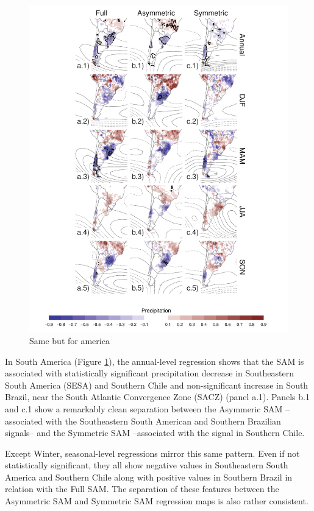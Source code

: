 \documentclass[twocol]{ametsocV5}
\begin{document}
\begin{figure}
\includegraphics{pp-regr-america-1} \caption[Same but for america]{Same but for america}\label{fig:pp-regr-america}
\end{figure}

In South America (Figure \ref{fig:pp-regr-america}), the annual-level
regression shows that the SAM is associated with statistically
significant precipitation decrease in Southeastern South America (SESA)
and Southern Chile and non-significant increase in South Brazil, near
the South Atlantic Convergence Zone (SACZ) (panel a.1). Panels b.1 and
c.1 show a remarkably clean separation between the Asymmeric SAM
--associated with the Southeastern South American and Southern Brazilian
signals-- and the Symmetric SAM --associated with the signal in Southern
Chile.

Except Winter, seasonal-level regressions mirror this same pattern. Even
if not statistically significant, they all show negative values in
Southeastern South America and Southern Chile along with positive values
in Southern Brazil in relation with the Full SAM. The separation of
these features between the Asymmetric SAM and Symmetric SAM regression
maps is also rather consistent.
\end{document}
